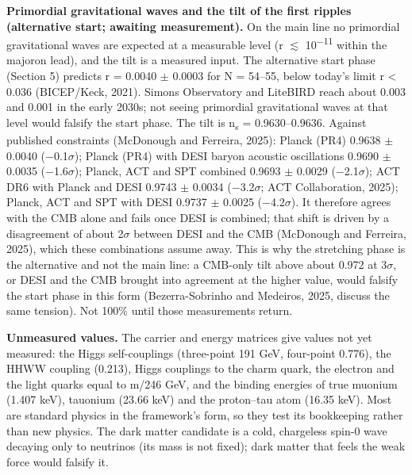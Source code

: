 \documentclass[
  11pt,
]{article}
\begin{document}
\textbf{Primordial gravitational waves and the tilt of the first ripples (alternative start; awaiting measurement).} On the main line no primordial gravitational waves are expected at a measurable level (r \ensuremath{\lesssim} 10\textsuperscript{\ensuremath{-}11} within the majoron lead), and the tilt is a measured input. The alternative start phase (Section 5) predicts r = 0.0040 \ensuremath{\pm} 0.0003 for N = 54--55, below today's limit r \textless{} 0.036 (BICEP/Keck, 2021). Simons Observatory and LiteBIRD reach about 0.003 and 0.001 in the early 2030s; not seeing primordial gravitational waves at that level would falsify the start phase. The tilt is n\textsubscript{s} = 0.9630--0.9636. Against published constraints (McDonough and Ferreira, 2025): Planck (PR4) 0.9638 \ensuremath{\pm} 0.0040 (\ensuremath{-}0.1\ensuremath{\sigma}); Planck (PR4) with DESI baryon acoustic oscillations 0.9690 \ensuremath{\pm} 0.0035 (\ensuremath{-}1.6\ensuremath{\sigma}); Planck, ACT and SPT combined 0.9693 \ensuremath{\pm} 0.0029 (\ensuremath{-}2.1\ensuremath{\sigma}); ACT DR6 with Planck and DESI 0.9743 \ensuremath{\pm} 0.0034 (\ensuremath{-}3.2\ensuremath{\sigma}; ACT Collaboration, 2025); Planck, ACT and SPT with DESI 0.9737 \ensuremath{\pm} 0.0025 (\ensuremath{-}4.2\ensuremath{\sigma}). It therefore agrees with the CMB alone and fails once DESI is combined; that shift is driven by a disagreement of about 2\ensuremath{\sigma} between DESI and the CMB (McDonough and Ferreira, 2025), which these combinations assume away. This is why the stretching phase is the alternative and not the main line: a CMB-only tilt above about 0.972 at 3\ensuremath{\sigma}, or DESI and the CMB brought into agreement at the higher value, would falsify the start phase in this form (Bezerra-Sobrinho and Medeiros, 2025, discuss the same tension). Not 100\% until those measurements return.

\textbf{Unmeasured values.} The carrier and energy matrices give values not yet measured: the Higgs self-couplings (three-point 191 GeV, four-point 0.776), the HHWW coupling (0.213), Higgs couplings to the charm quark, the electron and the light quarks equal to m/246 GeV, and the binding energies of true muonium (1.407 keV), tauonium (23.66 keV) and the proton--tau atom (16.35 keV). Most are standard physics in the framework's form, so they test its bookkeeping rather than new physics. The dark matter candidate is a cold, chargeless spin-0 wave decaying only to neutrinos (its mass is not fixed); dark matter that feels the weak force would falsify it.
\end{document}
